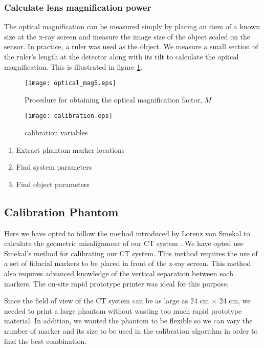\subsubsection{Calculate lens magnification power}
The optical magnification can be measured simply by placing an item of a known size at the x-ray screen and measure the image size of the object scaled on the sensor.  In practice, a ruler was used as the object. We measure a small section of the ruler's length at the detector along with its tilt to calculate the optical magnification.  This is illustrated in figure \ref{fig:optical_mag}.
\begin{figure}
\centering
\texttt{[image: optical\_mag5.eps]}
\label{fig:optical_mag}
\caption{Procedure for obtaining the optical magnification factor, $M$}
\end{figure}


\begin{figure}[ht]
\centering
\texttt{[image: calibration.eps]}
\caption{calibration variables}
\label{fig:calibration}
\end{figure}


\begin{enumerate}
\item Extract phantom marker locations
\item Find system parameters
\item Find object parameters
\end{enumerate}

\subsection{Calibration Phantom}
Here we have opted to follow the method introduced by Lorenz von Smekal to calculate the geometric misalignment of our CT system \cite{Smekal2004}. 
We have opted use Smekal's method for calibrating our CT system.  This method requires the use of a set of fiducial markers to be placed in front of the x-ray screen.  This method also requires advanced knowledge of the vertical separation between each markers.  The on-site rapid prototype printer was ideal for this purpose.

Since the field of view of the CT system can be as large as 24 cm $\times$ 24 cm, we needed to print a large phantom without wasting too much rapid prototype material.  In addition, we wanted the phantom to be flexible so we can vary the number of marker and its size to be used in the calibration algorithm in order to find the best combination.

